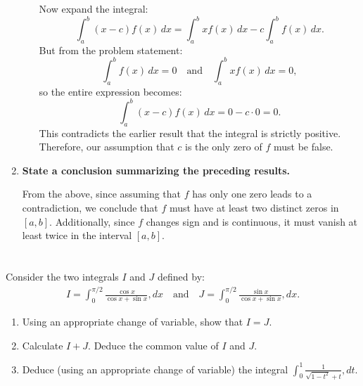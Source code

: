 \documentclass[12pt]{article}
\begin{document}
\begin{answerbox}
\begin{enumerate}
\begin{enumerate}
      Now expand the integral:
      $$
      \int_a^b (x - c)f(x)\,dx = \int_a^b x f(x)\,dx - c \int_a^b f(x)\,dx.
      $$
      But from the problem statement:
      $$
      \int_a^b f(x)\,dx = 0 \quad \text{and} \quad \int_a^b x f(x)\,dx = 0,
      $$
      so the entire expression becomes:
      $$
      \int_a^b (x - c)f(x)\,dx = 0 - c \cdot 0 = 0.
      $$
      This contradicts the earlier result that the integral is strictly positive. Therefore, our assumption that $ c $ is the only zero of $ f $ must be false.

  \end{enumerate}

  \item \textbf{State a conclusion summarizing the preceding results.}

  From the above, since assuming that $ f $ has only one zero leads to a contradiction, we conclude that $ f $ must have at least two distinct zeros in $[a, b]$. Additionally, since $ f $ changes sign and is continuous, it must vanish at least twice in the interval $[a, b]$.

\end{enumerate}
\end{answerbox}

\newpage

\section{}
Consider the two integrals $I$ and $J$ defined by:
\begin{align*}
I = \int_0^{\pi/2} \frac{\cos x}{\cos x + \sin x} , dx \quad \text{and} \quad J = \int_0^{\pi/2} \frac{\sin x}{\cos x + \sin x} , dx.
\end{align*}
\begin{enumerate}
\item Using an appropriate change of variable, show that $I = J$.
\item Calculate $I + J$. Deduce the common value of $I$ and $J$.
\item Deduce (using an appropriate change of variable) the integral $\int_0^1 \frac{1}{\sqrt{1-t^2} + t} , dt$.
\end{enumerate}

\newpage
\end{document}
